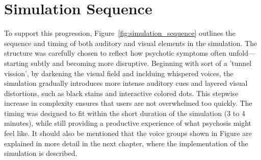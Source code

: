 \section{Simulation Sequence}

To support this progression, Figure~\ref{fig:simulation_sequence} outlines the sequence and timing of both auditory and visual elements in the simulation. The structure was carefully chosen to reflect how psychotic symptoms often unfold—starting subtly and becoming more disruptive. Beginning with sort of a 'tunnel vission', by darkening the visual field and inclduing whispered voices, the simulation gradually introduces more intense auditory cues and layered visual distortions, such as black stains and interactive colored dots. This stepwise increase in complexity ensures that users are not overwhelmed too quickly. The timing was designed to fit within the short duration of the simulation (3 to 4 minutes), while still providing a productive experience of what psychosis might feel like. It should also be mentioned that the voice groups shown in Figure are explained in more detail in the next chapter, where the implementation of the simulation is described.

